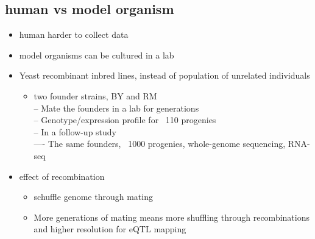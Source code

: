 \documentclass[font=12pt]{article}
\begin{document}
\subsection{human vs model organism}
\begin{itemize}
	\item human harder to collect data
	\item model organisms can be cultured in a lab
	\item Yeast recombinant inbred lines, instead of population of unrelated individuals
	\begin{itemize}
		\item two founder strains, BY and RM\\
		– Mate the founders in a lab for generations\\
		– Genotype/expression profile for ~110 progenies\\
		– In a follow-up study\\
		---- The same founders, ~1000 progenies, whole-genome sequencing, RNA-seq
	\end{itemize}
	\item effect of recombination
	\begin{itemize}
		\item schuffle genome through mating
		\item More generations of mating means more shuffling through recombinations and higher resolution for eQTL mapping
	\end{itemize}
\end{itemize}
\end{document}
